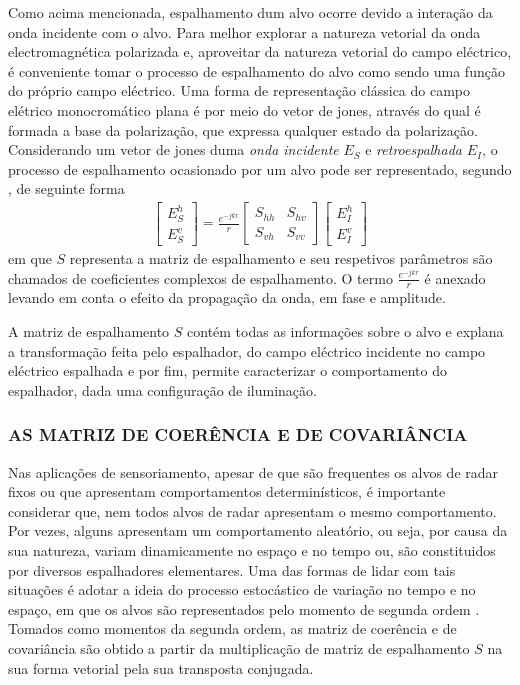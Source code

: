 \documentclass[a4paper,12pt]{article}
\begin{document}
Como acima mencionada, espalhamento dum alvo ocorre devido a interação da onda incidente com o alvo. Para melhor explorar a natureza vetorial da onda electromagnética polarizada e, aproveitar da natureza vetorial do campo eléctrico, é conveniente tomar o processo de espalhamento do alvo como sendo uma função do próprio campo eléctrico. Uma forma de representação clássica do campo elétrico monocromático plana é por meio do vetor de jones, através do qual é formada a base da polarização, que expressa qualquer estado da polarização. Considerando um vetor de jones duma \textit{onda incidente} $E_{S}$ e  \textit{retroespalhada} $E_{I}$, o processo de espalhamento ocasionado por um alvo pode ser representado, segundo \cite{jong:2009}, de seguinte forma 
\begin{align}
    \begin{bmatrix}
        E^h_{S} \\
        E^v_{S} 
    \end{bmatrix} = \frac{e^{-jkr}}{r}
    \begin{bmatrix}
        S_{hh} & S_{hv} \\
        S_{vh} & S_{vv}
    \end{bmatrix}
    \begin{bmatrix}
        E^h_{I} \\
        E^v_{I} 
    \end{bmatrix}
\end{align}
em que $S$ representa a matriz de espalhamento e seu respetivos parâmetros são chamados de coeficientes complexos de espalhamento. O termo  $\frac{e^{-jkr}}{r}$ é anexado levando em conta o efeito da propagação da onda, em fase e amplitude.

A matriz de espalhamento $S$ contém todas as informações sobre o alvo e explana a transformação feita pelo espalhador, do campo eléctrico incidente no campo eléctrico espalhada e por fim, permite caracterizar o comportamento do espalhador, dada uma configuração de iluminação.

\subsubsection{AS MATRIZ DE COERÊNCIA E DE COVARIÂNCIA}
\label{subsubsec:Mc}

Nas aplicações de sensoriamento, apesar de que são frequentes os alvos de radar fixos ou que apresentam comportamentos determinísticos, é importante considerar que, nem todos alvos de radar apresentam o mesmo comportamento. Por vezes, alguns apresentam um comportamento aleatório, ou seja, por causa da sua natureza, variam dinamicamente no espaço e no tempo ou, são constituidos por diversos espalhadores elementares. Uma das formas de lidar com tais situações é adotar a ideia do processo estocástico de variação no tempo e no espaço, em que os alvos são representados pelo momento de segunda ordem \cite{jong:2009}. Tomados como momentos da segunda ordem, as matriz de coerência e de covariância são obtido a partir da multiplicação de matriz de espalhamento $S$ na sua forma vetorial pela sua transposta conjugada.
\end{document}
